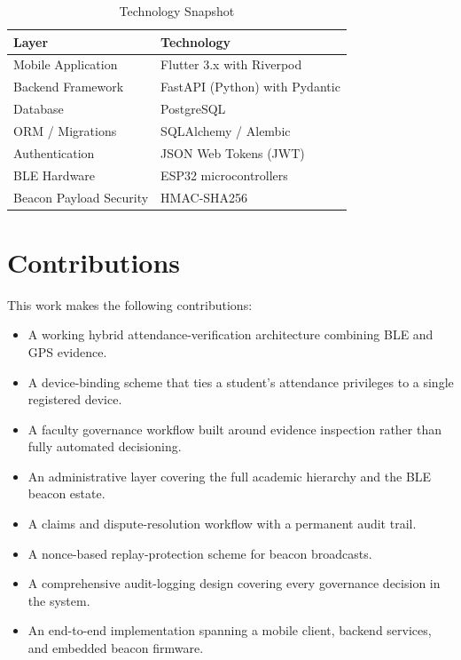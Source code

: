 \documentclass[12pt, a4paper, oneside]{report}
\begin{document}
\begin{table}[htbp]
\centering
\caption{Technology Snapshot}
\label{tab:tech-snapshot}
\begin{tabularx}{\textwidth}{|l|X|}
\hline
\textbf{Layer} & \textbf{Technology} \\
\hline
Mobile Application & Flutter 3.x with Riverpod \\
\hline
Backend Framework & FastAPI (Python) with Pydantic \\
\hline
Database & PostgreSQL \\
\hline
ORM / Migrations & SQLAlchemy / Alembic \\
\hline
Authentication & JSON Web Tokens (JWT) \\
\hline
BLE Hardware & ESP32 microcontrollers \\
\hline
Beacon Payload Security & HMAC-SHA256 \\
\hline
\end{tabularx}
\end{table}

\section{Contributions}
\label{sec:contributions}

This work makes the following contributions:

\begin{itemize}
    \item A working hybrid attendance-verification architecture combining BLE and GPS evidence.
    \item A device-binding scheme that ties a student's attendance privileges to a single registered device.
    \item A faculty governance workflow built around evidence inspection rather than fully automated decisioning.
    \item An administrative layer covering the full academic hierarchy and the BLE beacon estate.
    \item A claims and dispute-resolution workflow with a permanent audit trail.
    \item A nonce-based replay-protection scheme for beacon broadcasts.
    \item A comprehensive audit-logging design covering every governance decision in the system.
    \item An end-to-end implementation spanning a mobile client, backend services, and embedded beacon firmware.
\end{itemize}
\end{document}
